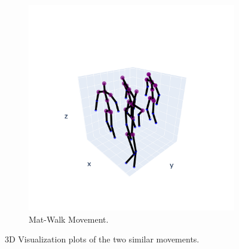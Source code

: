\begin{figure}[h]
\begin{subfigure}{.5\textwidth}
                  \includegraphics[width=1.\linewidth]{../src/resources/plots/movements/mov-8.png}
                  \caption{Mat-Walk Movement.}
                  \label{fig: mat-walk}
                \end{subfigure}
                \caption{3D Visualization plots of the two similar movements.}
            \end{figure}

\cleardoublepage